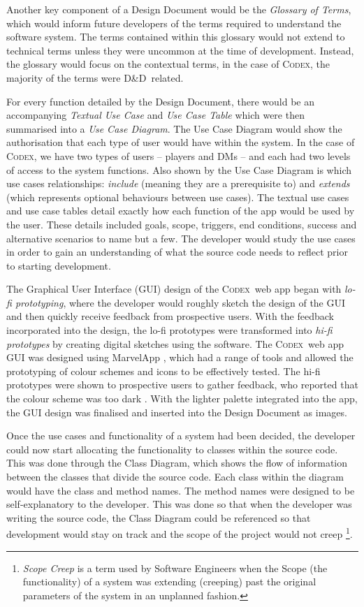 \documentclass[final]{cmpreport}
\newcommand{\dnd}{D\&D}
\newcommand{\Codex}{\textsc{Codex}}
\begin{document}
		Another key component of a Design Document would be the \emph{Glossary of Terms}, which would inform future developers of the terms required to understand the software system. The terms contained within this glossary would not extend to technical terms unless they were uncommon at the time of development. Instead, the glossary would focus on the contextual terms, in the case of \Codex, the majority of the terms were \dnd \ related.
		
		For every function detailed by the Design Document, there would be an accompanying \emph{Textual Use Case} and \emph{Use Case Table} which were then summarised into a \emph{Use Case Diagram}. The Use Case Diagram would show the authorisation that each type of user would have within the system. In the case of \Codex, we have two types of users -- players and DMs -- and each had two levels of access to the system functions. Also shown by the Use Case Diagram is which use cases relationships: \emph{include} (meaning they are a prerequisite to) and \emph{extends} (which represents optional behaviours between use cases). The textual use cases and use case tables detail exactly how each function of the app would be used by the user. These details included goals, scope, triggers, end conditions, success and alternative scenarios to name but a few. The developer would study the use cases in order to gain an understanding of what the source code needs to reflect prior to starting development.

		The Graphical User Interface (GUI) design of the \Codex \ web app began with \emph{lo-fi prototyping}, where the developer would roughly sketch the design of the GUI and then quickly receive feedback from prospective users. With the feedback incorporated into the design, the lo-fi prototypes were transformed into \emph{hi-fi prototypes} by creating digital sketches using the software. The \Codex \ web app GUI was designed using MarvelApp \citep{marvelapp}, which had a range of tools and allowed the prototyping of colour schemes and icons to be effectively tested. The hi-fi prototypes were shown to prospective users to gather feedback, who reported that the colour scheme was too dark \citep{GUIDesign}. With the lighter palette integrated into the app, the GUI design was finalised and inserted into the Design Document as images. 
		
		Once the use cases and functionality of a system had been decided, the developer could now start allocating the functionality to classes within the source code. This was done through the Class Diagram, which shows the flow of information between the classes that divide the source code. Each class within the diagram would have the class and method names. The method names were designed to be self-explanatory to the developer. This was done so that when the developer was writing the source code, the Class Diagram could be referenced so that development would stay on track and the scope of the project would not creep \footnote{\emph{Scope Creep} is a term used by Software Engineers when the Scope (the functionality) of a system was extending (creeping) past the original parameters of the system in an unplanned fashion.}.
		
\end{document}
